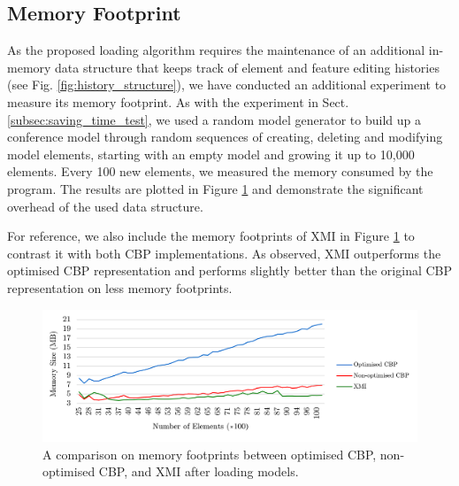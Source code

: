 \documentclass{llncs}
\begin{document}
         
\subsection{Memory Footprint}
\label{subsec:memory_consumption}
As the proposed loading algorithm requires the maintenance of an additional in-memory data structure that keeps track of element and feature editing histories (see Fig. \ref{fig:history_structure}), we have conducted an additional experiment to measure its memory footprint. As with the experiment in Sect. \ref{subsec:saving_time_test}, we used a random model generator to build up a conference model through random sequences of creating, deleting and modifying model elements, starting with an empty model and growing it up to 10,000 elements. Every 100 new elements, we measured the memory consumed by the program. The results are plotted in Figure \ref{fig:memory_ocbp_cbp_xmi} and demonstrate the significant overhead of the used data structure.

For reference, we also include the memory footprints of XMI in Figure \ref{fig:memory_ocbp_cbp_xmi} to contrast it with both CBP implementations. As observed, XMI outperforms the optimised CBP representation and performs slightly better than the original CBP representation on less memory footprints. 

\begin{figure}[b]	
\centering
\includegraphics[width=\linewidth]{memory_ocbp_cbp_xmi}
		\caption{A comparison on memory footprints between optimised CBP, non-optimised CBP, and XMI after loading models.}\label{fig:memory_ocbp_cbp_xmi}
\end{figure}
\end{document}
